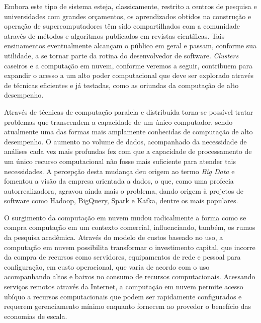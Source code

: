 \documentclass[english,brazilian]{UNISINOSmonografia} %
\begin{document}
Embora este tipo de sistema esteja, classicamente, restrito a centros de pesquisa e universidades com grandes orçamentos, os aprendizados obtidos na construção e operação de supercomputadores têm sido compartilhados com a comunidade através de métodos e algoritmos publicados em revistas científicas.
Tais ensinamentos eventualmente alcançam o público em geral e passam, conforme sua utilidade, a se tornar parte da rotina do desenvolvedor de software.
\textit{Clusters} caseiros e a computação em nuvem, conforme veremos a seguir, contribuem para expandir o acesso a um alto poder computacional que deve ser explorado através de técnicas eficientes e já testadas, como as oriundas da computação de alto desempenho.


Através de técnicas de computação paralela e distribuída torna-se possível tratar problemas que transcendem a capacidade de um único computador, sendo atualmente uma das formas mais amplamente conhecidas de computação de alto desempenho.
O aumento no volume de dados, acompanhado da necessidade de análises cada vez mais profundas fez com que a capacidade de processamento de um único recurso computacional não fosse mais suficiente para atender tais necessidades.
A percepção desta mudança deu origem ao termo \textit{Big Data} e fomentou a visão da empresa orientada a dados, o que, como uma profecia autorrealizadora, agravou ainda mais o problema, dando origem à projetos de software como Hadoop, BigQuery, Spark e Kafka, dentre os mais populares.


O surgimento da computação em nuvem mudou radicalmente a forma como se compra computação em um contexto comercial, influenciando, também, os rumos da pesquisa acadêmica.
Através do modelo de custos baseado no uso, a computação em nuvem possibilita transformar o investimento capital, que incorre da compra de recursos como servidores, equipamentos de rede e pessoal para configuração, em custo operacional, que varia de acordo com o uso acompanhando altos e baixos no consumo de recursos computacionais.
Acessando serviços remotos através da Internet, a computação em nuvem permite acesso ubíquo a recursos computacionais que podem ser rapidamente configurados e requerem gerenciamento mínimo enquanto fornecem ao provedor o benefício das economias de escala.
\end{document}
